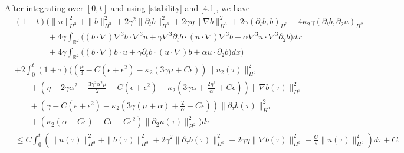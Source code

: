 \documentclass[reqno,11pt]{amsart}
\def\R{\mathbb R}
\numberwithin{Thm}{section}
\begin{document}
After integrating over $[0,t]$ and using \eqref{stability} and \eqref{4.1}, we have
\begin{align*}
&(1+t)\Big(\|u\|^2_{H^3}+\| b\|^2_{H^3}+2\gamma^2\|\partial_tb\|^2_{H^3}
+2\gamma\eta\|\nabla b\|^2_{H^3}+2\gamma(\partial_tb,b)_{H^3}-4\kappa_2\gamma(\partial_tb,\partial_2u)_{H^2}\nonumber\\
&\qquad\qquad+4\gamma\int_{\R^2}\big((b\cdot\nabla)\nabla^3 b\cdot\nabla^3 u+\gamma\nabla^3\partial_{t}b\cdot (u\cdot\nabla)\nabla^3 b+\alpha\nabla^3u\cdot\nabla^3\partial_2 b\big)dx\nonumber\\
&\qquad\qquad+4\gamma\int_{\R^2}\big((b\cdot\nabla) b\cdot u+\gamma\partial_{t}b\cdot (u\cdot\nabla) b+\alpha u\cdot\partial_2 b\big)dx\Big)\nonumber\\
&+2\int_{0}^{t}(1+\tau)\big((\frac{\mu}{3}-C(\epsilon+\epsilon^2)-\kappa_2(3\gamma\mu+C\epsilon))\|u_2(\tau)\|^2_{H^3}\nonumber\\
&\ \ \ \ \ \ \ \ +(\eta-2\gamma\alpha^2-\frac{3\gamma^2\alpha^2\mu}{2}-C(\epsilon+\epsilon^2)-\kappa_2(3\gamma\alpha+\frac{2\eta^2}{\alpha}+C\epsilon))\|\nabla b(\tau)\|^2_{H^3}\nonumber\\
&\ \ \ \ \ \ \ \ +(\gamma-C(\epsilon+\epsilon^2)-\kappa_2(3\gamma(\mu+\alpha)+\frac{2}{\alpha}+C\epsilon))\|\partial_{\tau}b(\tau)\|^2_{H^3}\nonumber\\
&\ \ \ \ \ \ \ \ +(\kappa_2(\alpha-C\epsilon)-C\epsilon-C\epsilon^2)\|\partial_2u(\tau)\|_{H^2}^2\big)d\tau\nonumber\\
&\leq C\int_{0}^{t}\left(\|u(\tau)\|^2_{H^3}+\| b(\tau)\|^2_{H^3}+2\gamma^2\|\partial_{\tau}b(\tau)\|^2_{H^3}
+2\gamma\eta\|\nabla b(\tau)\|^2_{H^3}+\frac{C}{\epsilon}\|u(\tau)\|_{H^3}^2\right)d\tau+C.
\end{align*}
\end{document}
